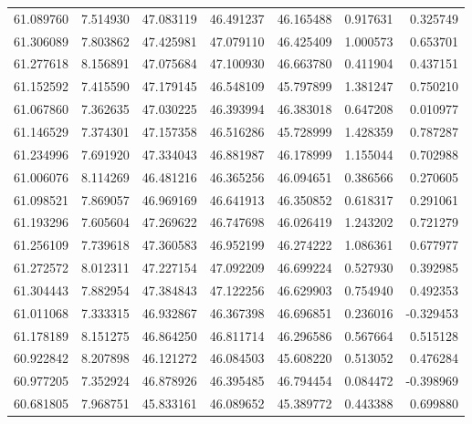\begin{tabular}{rrrrrrr}
 61.089760 &   7.514930 &         47.083119 &         46.491237 &         46.165488 &  0.917631 &  0.325749 \\
 61.306089 &   7.803862 &         47.425981 &         47.079110 &         46.425409 &  1.000573 &  0.653701 \\
 61.277618 &   8.156891 &         47.075684 &         47.100930 &         46.663780 &  0.411904 &  0.437151 \\
 61.152592 &   7.415590 &         47.179145 &         46.548109 &         45.797899 &  1.381247 &  0.750210 \\
 61.067860 &   7.362635 &         47.030225 &         46.393994 &         46.383018 &  0.647208 &  0.010977 \\
 61.146529 &   7.374301 &         47.157358 &         46.516286 &         45.728999 &  1.428359 &  0.787287 \\
 61.234996 &   7.691920 &         47.334043 &         46.881987 &         46.178999 &  1.155044 &  0.702988 \\
 61.006076 &   8.114269 &         46.481216 &         46.365256 &         46.094651 &  0.386566 &  0.270605 \\
 61.098521 &   7.869057 &         46.969169 &         46.641913 &         46.350852 &  0.618317 &  0.291061 \\
 61.193296 &   7.605604 &         47.269622 &         46.747698 &         46.026419 &  1.243202 &  0.721279 \\
 61.256109 &   7.739618 &         47.360583 &         46.952199 &         46.274222 &  1.086361 &  0.677977 \\
 61.272572 &   8.012311 &         47.227154 &         47.092209 &         46.699224 &  0.527930 &  0.392985 \\
 61.304443 &   7.882954 &         47.384843 &         47.122256 &         46.629903 &  0.754940 &  0.492353 \\
 61.011068 &   7.333315 &         46.932867 &         46.367398 &         46.696851 &  0.236016 & -0.329453 \\
 61.178189 &   8.151275 &         46.864250 &         46.811714 &         46.296586 &  0.567664 &  0.515128 \\
 60.922842 &   8.207898 &         46.121272 &         46.084503 &         45.608220 &  0.513052 &  0.476284 \\
 60.977205 &   7.352924 &         46.878926 &         46.395485 &         46.794454 &  0.084472 & -0.398969 \\
 60.681805 &   7.968751 &         45.833161 &         46.089652 &         45.389772 &  0.443388 &  0.699880 \\

\end{tabular}
